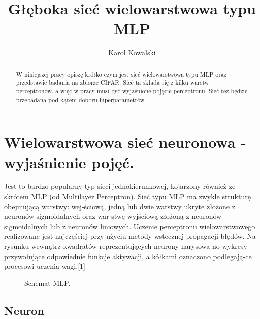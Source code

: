 \documentclass{article}
\title{Głęboka sieć wielowarstwowa typu MLP}
\author{Karol Kowalski}
\begin{document}

\maketitle

\begin{abstract}
  W niniejszej pracy opiszę krótko czym jest sieć wielowarstwowa
  typu MLP oraz przedstawie badania na zbiorze CIFAR.
  Sieć ta składa się z kilku warstw perceptronów, a więc w pracy musi być
  wyjaśnione pojęcie perceptronu. Sieć też będzie przebadana pod kątem
  doboru hiperparametrów.
\end{abstract}

\section{Wielowarstwowa sieć neuronowa - wyjaśnienie pojęć.}

Jest to bardzo popularny typ sieci jednokierunkowej, kojarzony
również ze skrótem MLP (od Multilayer Perceptron). Sieć typu MLP
ma zwykle strukturę obejmującą warstwy: wej-ściową, jedną lub dwie
warstwy ukryte złożone z neuronów sigmoidalnych oraz war-stwę
wyjściową złożoną z neuronów sigmoidalnych lub z neuronów liniowych.
Uczenie perceptronu wielowarstwowego realizowane jest najczęściej
przy użyciu metody wstecznej propagacji błędów. Na rysunku wewnątrz
kwadratów reprezentujących neurony narysowa-no wykresy przywołujące
odpowiednie funkcje aktywacji, a kółkami oznaczono podlegają-ce procesowi
uczenia wagi.[1]

\begin{figure}[h]
  \centering
  \caption{Schemat MLP.}
\end{figure}

\subsection{Neuron}
\end{document}
